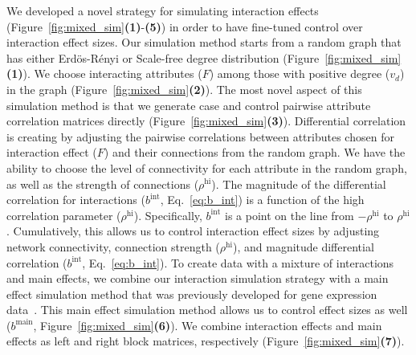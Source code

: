 \documentclass[10pt,letterpaper]{article}
\begin{document}
We developed a novel strategy for simulating interaction effects (Figure~\ref{fig:mixed_sim}\textbf{(1)}-\textbf{(5)}) in order to have fine-tuned control over interaction effect sizes. Our simulation method starts from a random graph that has either Erd\"{o}s-R\'{e}nyi or Scale-free degree distribution (Figure~\ref{fig:mixed_sim}\textbf{(1)}). We choose interacting attributes ($F$) among those with positive degree ($v_d$) in the graph (Figure~\ref{fig:mixed_sim}\textbf{(2)}). The most novel aspect of this simulation method is that we generate case and control pairwise attribute correlation matrices directly (Figure~\ref{fig:mixed_sim}\textbf{(3)}). Differential correlation is creating by adjusting the pairwise correlations between attributes chosen for interaction effect ($F$) and their connections from the random graph. We have the ability to choose the level of connectivity for each attribute in the random graph, as well as the strength of connections ($\rho^\text{hi}$). The magnitude of the differential correlation for interactions ($b^\text{int}$, Eq.~\ref{eq:b_int}) is a function of the high correlation parameter ($\rho^\text{hi}$). Specifically, $b^\text{int}$ is a point on the line from $-\rho^\text{hi}$ to $\rho^\text{hi}$. Cumulatively, this allows us to control interaction effect sizes by adjusting network connectivity, connection strength ($\rho^\text{hi}$), and magnitude differential correlation ($b^\text{int}$, Eq.~\ref{eq:b_int}). To create data with a mixture of interactions and main effects, we combine our interaction simulation strategy with a main effect simulation method that was previously developed for gene expression data~\cite{leek2007}. This main effect simulation method allows us to control effect sizes as well ($b^\text{main}$, Figure~\ref{fig:mixed_sim}\textbf{(6)}). We combine interaction effects and main effects as left and right block matrices, respectively (Figure~\ref{fig:mixed_sim}\textbf{(7)}). 
\end{document}
